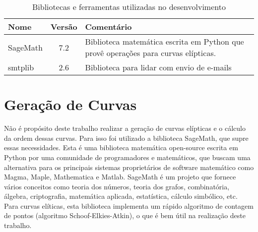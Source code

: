 %
%
%
\begin{table}[!ht]
\centering
    \begin{tabularx}{0.95\textwidth}{lcX}

    \toprule
        \textbf{Nome}  &  \textbf{Versão}  &  \textbf{Comentário}  \\
    \midrule
        SageMath & 7.2 & Biblioteca matemática escrita em Python que provê operações para curvas elípticas.  \\
        \rowcolor[gray]{0.9}
        smtplib  & 2.6  & Biblioteca para lidar com envio de e-mails                                         \\
    \bottomrule

    \end{tabularx}
\caption{Bibliotecas e ferramentas utilizadas no desenvolvimento}
\label{table:libs}

\end{table}

%
%
\section{Geração de Curvas}
Não é propósito deste trabalho realizar a geração de curvas elípticas e o cálculo da ordem dessas curvas. Para isso foi utilizado a biblioteca SageMath, que supre essas necessidades. Esta é uma biblioteca matemática open-source escrita em Python por uma comunidade de programadores e matemáticos, que buscam uma alternativa para os principais sistemas proprietários de software matemático como Magma, Maple, Mathematica e Matlab. SageMath é um projeto que fornece vários conceitos como teoria dos números, teoria dos grafos, combinatória, álgebra, criptografia, matemática aplicada, estatística, cálculo simbólico, etc. Para curvas elíticas, esta biblioteca implementa um rápido algoritmo de contagem de pontos (algoritmo Schoof-Elkies-Atkin), o que é bem útil na realização deste trabalho.

